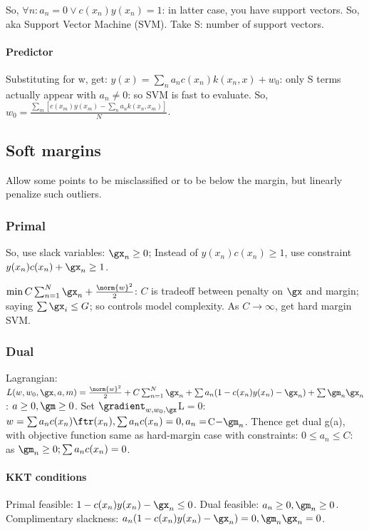 \documentclass[oneside, article]{memoir}
\begin{document}
So, $\forall n: a_{n} = 0 \lor c(x_{n})y(x_{n})= 1$: in latter case, you have support vectors. So, aka Support Vector Machine (SVM). Take S: number of support vectors.

\paragraph*{Predictor}
Substituting for w, get: $y(x) = \sum_{n}a_{n}c(x_{n})k(x_{n}, x) + w_0$: only S terms actually appear with $a_{n} \neq 0$: so SVM is fast to evaluate. So, $w_0 = \frac{\sum_{m} [c(x_{m})y(x_m) - \sum_n a_{n}k(x_{n}, x_{m})]}{N}$.

\subsection{Soft margins}
Allow some points to be misclassified or to be below the margin, but linearly penalize such outliers.

\subsubsection{Primal}
So, use slack variables: $\gx_{n} \geq 0$; Instead of $y(x_{n})c(x_{n}) \geq 1$, use constraint $y(x_{n})c(x_{n}) + \gx_{n} \geq 1$.

$\min C\sum_{n=1}^{N} \gx_{n} + \frac{\norm{w}^{2}}{2}$: $C$ is tradeoff between penalty on $\gx$ and margin; saying $\sum \gx_i \leq G$; so controls model complexity. As $C \to \infty$, get hard margin SVM.

\subsubsection{Dual}
Lagrangian: $L(w, w_0, \gx, a, m) = \frac{\norm{w}^{2}}{2} + C\sum_{n=1}^{N} \gx_{n} + \sum a_{n}(1 - c(x_{n})y(x_{n}) - \gx_{n}) + \sum \gm_{n}\gx_{n}$: $a \geq 0, \gm \geq 0$. Set $\gradient_{w, w_0, \gx} $L$ = 0$: $w = \sum a_{n}c(x_{n})\ftr(x_{n}), \sum a_{n}c(x_{n}) = 0, a_{n} = $C$ - \gm_{n}$. Thence get dual g(a), with objective function same as hard-margin case with constraints: $0 \leq a_{n} \leq C$: as $\gm_{n} \geq 0; \sum a_{n}c(x_{n}) = 0$.

\paragraph*{KKT conditions}
Primal feasible: $1- c(x_{n})y(x_{n}) - \gx_{n} \leq 0$. Dual feasible: $a_{n} \geq 0, \gm_{n} \geq 0$. Complimentary slackness: $a_{n}(1 - c(x_{n})y(x_{n}) - \gx_{n}) = 0, \gm_{n}\gx_{n} = 0$.
\end{document}

